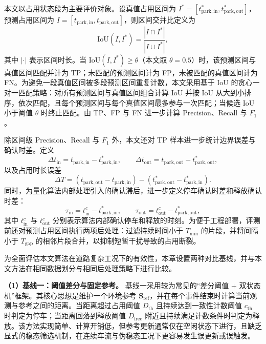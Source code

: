 \documentclass{xdupgthesis}
\begin{document}
本文以占用状态段为主要评价对象。设真值占用区间为 $I^{*}=[t^{*}_{\mathrm{park,in}},t^{*}_{\mathrm{park,out}}]$，预测占用区间为 $I=[t_{\mathrm{park,in}},t_{\mathrm{park,out}}]$，则区间交并比定义为
\begin{equation}
    \mathrm{IoU}(I,I^{*})=\frac{|I\cap I^{*}|}{|I\cup I^{*}|},
\end{equation}
其中 $|\cdot|$ 表示区间时长。当 $\mathrm{IoU}(I,I^{*})\ge \theta$（本文取 $\theta=0.5$）时，该预测区间与真值区间匹配并计为 TP；未匹配的预测区间计为 FP，未被匹配的真值区间计为 FN。为避免一段真值区间被多段预测区间重复计数，本文采用基于 IoU 的贪心一对一匹配策略：对所有预测区间与真值区间组合计算 IoU 并按 IoU 从大到小排序，依次匹配，且每个预测区间与每个真值区间最多参与一次匹配；当候选 IoU 小于阈值 $\theta$ 时终止匹配。由 TP、FP 与 FN 进一步计算 Precision、Recall 与 $F_1$。

除区间级 Precision、Recall 与 $F_1$ 外，本文还对 TP 样本进一步统计边界误差与确认时差。定义
\begin{equation}
    \Delta t_{\mathrm{in}}=t_{\mathrm{park,in}}-t^{*}_{\mathrm{park,in}},\qquad
    \Delta t_{\mathrm{out}}=t_{\mathrm{park,out}}-t^{*}_{\mathrm{park,out}},
\end{equation}
以及占用时长误差
\begin{equation}
    \Delta T=(t_{\mathrm{park,out}}-t_{\mathrm{park,in}})-(t^{*}_{\mathrm{park,out}}-t^{*}_{\mathrm{park,in}}).
\end{equation}
同时，为量化算法内部处理引入的确认滞后，进一步定义停车确认时差和释放确认时差：
\begin{equation}
    \tau_{\mathrm{in}}=t^{c}_{\mathrm{in}}-t^{*}_{\mathrm{park,in}},\qquad
    \tau_{\mathrm{out}}=t^{c}_{\mathrm{out}}-t^{*}_{\mathrm{park,out}},
\end{equation}
其中 $t^{c}_{\mathrm{in}}$ 与 $t^{c}_{\mathrm{out}}$ 分别表示算法内部确认停车和释放的时刻。为便于工程部署，评测前还对预测占用区间执行两项后处理：过滤持续时间小于 $T_{\min}$ 的片段，并将间隔小于 $T_{\mathrm{gap}}$ 的相邻片段合并，以抑制短暂干扰导致的占用断裂。

为全面评估本文算法在道路复杂工况下的有效性，本章设置两种对比基线，并与本文方法在相同数据划分与相同后处理策略下进行比较。

\textbf{（1）基线一：阈值差分与固定参考。}
基线一采用较为常见的“差分阈值 + 双状态机”框架。其核心思想是维护一个环境参考 $\mathbf{S}_{\mathrm{ref}}$，并在每个事件结束时计算当前观测与参考之间的距离。当距离超过占用阈值 $D_{\mathrm{th}}$ 且持续达到一致性计数阈值 $c_{\mathrm{th}}$ 时判定为停车；当距离回落到释放阈值 $D_{\mathrm{free}}$ 附近且持续满足计数条件时判定为释放。该方法实现简单、计算开销低，但参考更新通常仅在空闲状态下进行，且缺乏显式的稳态筛选机制，在连续车流与伪稳态工况下更容易发生误更新或误触发。
\end{document}
